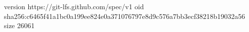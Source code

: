 version https://git-lfs.github.com/spec/v1
oid sha256:c6465f41a1bc0a199ee824e0a371076797e8d9c576a7bb3ecf38218b19032a56
size 26061
